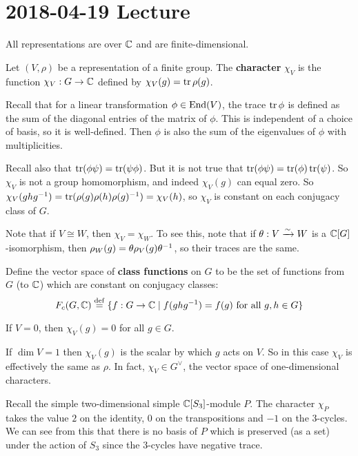 \section{2018-04-19 Lecture}

\begin{rmk}
	All representations are over $\mathbb{C}$ and are finite-dimensional.
\end{rmk}

\begin{defn}
	Let $(V,\rho)$ be a representation of a finite group.
	The \textbf{character} $\chi_V$ is the function $\chi_V:G \to \mathbb{C}$ defined by $\chi_V(g)= \operatorname{tr}\rho(g)$.
\end{defn}

\begin{rmk}
	Recall that for a linear transformation $\phi \in \operatorname{End}(V)$, the trace $\operatorname{tr}\phi$ is defined as the sum of the diagonal entries of the matrix of $\phi$.
	This is independent of a choice of basis, so it is well-defined.
	Then $\phi$ is also the sum of the eigenvalues of $\phi$ with multiplicities.

	Recall also that $\operatorname{tr}(\phi\psi)=\operatorname{tr}(\psi\phi)$.
	But it is not true that $\operatorname{tr}(\phi\psi)=\operatorname{tr}(\phi)\operatorname{tr}(\psi)$.
	So $\chi_V$ is not a group homomorphism, and indeed $\chi_V(g)$ can equal zero.
	So $\chi_V(ghg^{-1}) = \operatorname{tr}(\rho(g)\rho(h)\rho(g)^{-1}) = \chi_V(h)$, so $\chi_V$ is constant on each conjugacy class of $G$.
	
	Note that if $V \cong W$, then $\chi_V=\chi_W$.
	To see this, note that if $\theta: V \xrightarrow{\sim} W$ is a $\mathbb{C}[G]$-isomorphism, then $\rho_W(g)=\theta\rho_V(g)\theta^{-1}$, so their traces are the same.
\end{rmk}

\begin{defn}
	Define the vector space of \textbf{class functions} on $G$ to be the set of functions from $G$ (to $\mathbb{C}$) which are constant on conjugacy classes:
	\[F_c(G,\mathbb{C}) \overset{\mathrm{def}}{=} \{f: G \to \mathbb{C} \mid f(ghg^{-1})=f(g) \text{ for all } g,h \in G\}\]
\end{defn}

\begin{exam}\label{12:ex}
	\leavevmode
	\begin{enum}
		\io
		If $V=0$, then $\chi_V(g)=0$ for all $g \in G$.

		\io
		If $\dim V=1$ then $\chi_V(g)$ is the scalar by which $g$ acts on $V$.
		So in this case $\chi_V$ is effectively the same as $\rho$.
		In fact, $\chi_V \in G^\vee$, the vector space of one-dimensional characters.
		
		\io\label{12:s3}
		Recall the simple two-dimensional simple $\mathbb{C}[S_3]$-module $P$.
		The character $\chi_P$ takes the value $2$ on the identity, $0$ on the transpositions and $-1$ on the $3$-cycles.
		We can see from this that there is no basis of $P$ which is preserved (as a set) under the action of $S_3$ since the $3$-cycles have negative trace.
	\end{enum}
\end{exam}

